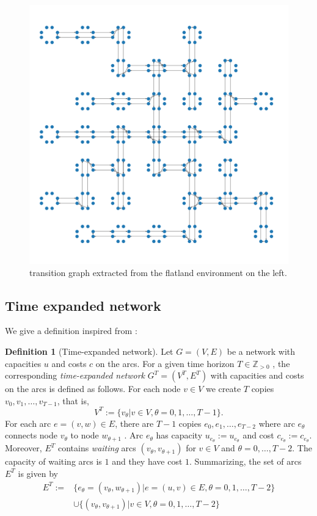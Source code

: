 \documentclass[14pt,a4paper]{article}
\theoremstyle{definition}
\newtheorem{madef}{Definition}[section]
\numberwithin{equation}{subsection}
\begin{document}
\begin{figure}[h]
\begin{minipage}{0.5\linewidth}
		\includegraphics[width=\linewidth]{img/first_graph.png}
		\caption{transition graph extracted from the flatland environment on the left.}
	\end{minipage}
\end{figure}

\subsection{Time expanded network}
\label{ten}
We give a definition inspired from \cite[p.~19]{Skutella2008AnIT}:
\begin{madef}[Time-expanded network]
	 Let $G = (V, E)$ be a network with capacities $u$ and costs $c$ on the arcs. For a given time horizon $T\in \mathds{Z}_{>0}$ ,	the corresponding \emph{time-expanded network} $G^T = (V^T, E^T)$ with capacities and costs on the arcs
	is defined as follows. For each node $v\in V$ we create $T$ copies $v_0 , v_1 , \ldots, v_{T-1} $, that is,
	$$V^T := \{v_\theta | v \in V, \theta = 0, 1, \ldots, T-1\}.$$
	For each arc $e = (v, w) \in E$, there are $T-1$  copies $e_0,e_1,\ldots,e_{T-2}$ where arc $e_\theta$ connects
	node $v_\theta$ to node $w_{\theta+1}$ . Arc $e_\theta$ has capacity $u_{e_{\theta}}:= u_{e_\theta}$ and cost $c_{e_{\theta}}:= c_{e_\theta}$. Moreover, $E^T$ contains
	\emph{waiting} arcs $(v_\theta , v _{\theta+1})$ for $v \in V$ and $\theta = 0,\ldots, T-2$. The capacity of waiting arcs is $1$
	and they have cost $1$. Summarizing, the set of arcs $E^T$ is given by
	\begin{align*}
	 E^T := &\{e_\theta = (v_\theta,w_{\theta+1})| e = (u,v) \in E, \theta=0,1,\ldots,T-2 \} \\
	 &\cup \{(v_\theta,v_{\theta+1})|v\in V, \theta=0,1,\ldots,T-2 \}
	 \end{align*}
\end{madef}
\end{document}
